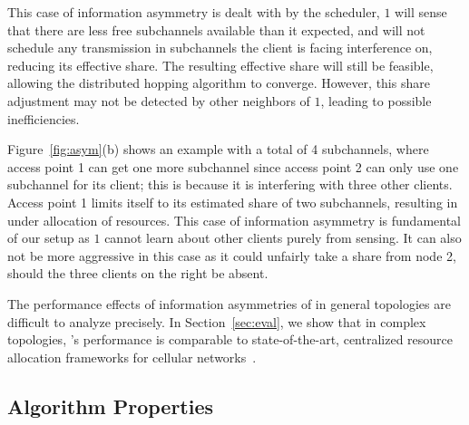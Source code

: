 This case of information asymmetry is dealt with by the scheduler, \eNB $1$ will sense that there are less free subchannels available than it expected, and will not schedule any transmission in subchannels the client is facing interference on, reducing its effective share. The resulting effective share will still be feasible, allowing the distributed hopping algorithm to converge. However, this share adjustment may not be detected by other neighbors of \eNB $1$, leading to possible inefficiencies.


 Figure~\ref{fig:asym}(b) shows an example with a total of 4 subchannels, where access point 1 can get one more subchannel since access point 2 can only use one subchannel for its client;
this is because it is interfering with three other clients. Access point 1 limits itself to its estimated share of two subchannels, resulting in under allocation of resources. 
This case of information asymmetry is fundamental of our setup as \eNB $1$ cannot learn about other clients purely from sensing. It can also not be more aggressive in this case as it could unfairly take a share 
from node 2, should the three clients on the right be absent. 

The performance effects of information asymmetries of \cf in general topologies are difficult to analyze precisely. 
In Section~\ref{sec:eval},
 we show that in complex topologies, \cf's performance is comparable to state-of-the-art, centralized resource allocation frameworks for cellular networks~\cite{fermi}.



\subsection{Algorithm Properties}
\label{sec:proof}

